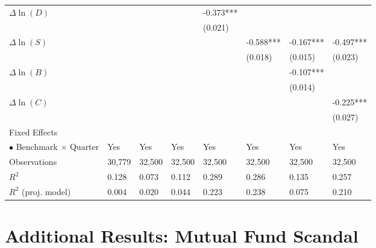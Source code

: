 \documentclass[openany]{book}
\theoremstyle{definition}
\theoremstyle{definition}
\theoremstyle{definition}
\theoremstyle{remark}
\begin{document}
\begin{table}[ht]
\begin{tabularx}{0.975\textwidth}{lYYYYYYY}
  $\Delta\ln(D)$ &  &  &  & -0.373*** &  &  &  \\ 
   &  &  &  & (0.021) &  &  &  \\ 
  $\Delta\ln(S)$ &  &  &  &  & -0.588*** & -0.167*** & -0.497*** \\ 
   &  &  &  &  & (0.018) & (0.015) & (0.023) \\ 
  $\Delta\ln(B)$ &  &  &  &  &  & -0.107*** &  \\ 
   &  &  &  &  &  & (0.014) &  \\ 
  $\Delta\ln(C)$ &  &  &  &  &  &  & -0.225*** \\ 
   &  &  &  &  &  &  & (0.027) \\ 
  Fixed Effects &  &  &  &  &  &  &  \\ 
  $\bullet$ Benchmark $\times$ Quarter & Yes & Yes & Yes & Yes & Yes & Yes & Yes \\ 
  Observations & 30,779 & 32,500 & 32,500 & 32,500 & 32,500 & 32,500 & 32,500 \\ 
  $R^2$ & 0.128 & 0.073 & 0.112 & 0.289 & 0.286 & 0.135 & 0.257 \\ 
  $R^2$ (proj. model) & 0.004 & 0.020 & 0.044 & 0.223 & 0.238 & 0.075 & 0.210 \\ 
   \bottomrule
\end{tabularx}
\endgroup
\end{table}

\chapter{Additional Results: Mutual Fund
Scandal}\label{additional-results-mutual-fund-scandal}
\end{document}
